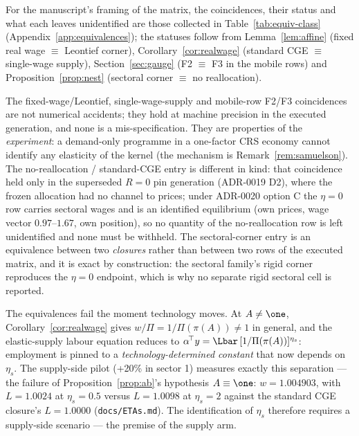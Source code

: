 \begin{corollary}[Classification]\label{cor:class}
For the manuscript's framing of the matrix, the coincidences, their status
and what each leaves unidentified are those collected in
Table~\ref{tab:equiv-class} (Appendix~\ref{app:equivalences}); the
statuses follow from Lemma~\ref{lem:affine} (fixed real wage $\equiv$
Leontief corner), Corollary~\ref{cor:realwage} (standard CGE $\equiv$
single-wage supply), Section~\ref{sec:gauge} (F2 $\equiv$ F3 in the mobile
rows) and Proposition~\ref{prop:nest} (sectoral corner $\equiv$ no
reallocation).

The fixed-wage/Leontief, single-wage-supply and mobile-row F2/F3
coincidences are not numerical
accidents; they hold at machine precision in the executed generation, and
none is a mis-specification. They are properties of the \emph{experiment}: a
demand-only programme in a one-factor CRS economy cannot identify any
elasticity of the kernel (the mechanism is Remark~\ref{rem:samuelson}). The
no-reallocation / standard-CGE entry is different in kind: that
coincidence held only in the
superseded $R = 0$ pin generation (ADR-0019 D2), where the frozen allocation
had no channel to prices; under ADR-0020 option C the $\eta = 0$ row carries
sectoral wages and is an identified equilibrium (own prices, wage vector
$0.97$--$1.67$, own position), so no quantity of the
no-reallocation row is left
unidentified and none must be withheld.
The sectoral-corner entry is an equivalence between two
\emph{closures} rather than between two rows of the executed matrix, and it is
exact by construction: the sectoral family's rigid corner reproduces the
$\eta = 0$ endpoint, which is why no separate rigid sectoral cell is reported.
\end{corollary}

\begin{remark}\label{rem:supply}
The equivalences fail the moment technology moves. At $A \neq \one$,
Corollary~\ref{cor:realwage} gives $w/\Pi = 1/\Pi(\pi(A)) \neq 1$ in
general, and the elastic-supply labour equation reduces to
$\alpha^{\!\top}y = \Lbar\,[1/\Pi(\pi(A))]^{\eta_s}$: employment is pinned
to a \emph{technology-determined constant} that now depends on $\eta_s$.
The supply-side pilot (+20\% in sector 1) measures exactly this separation
--- the failure of Proposition~\ref{prop:ab}'s hypothesis $A \equiv \one$:
$w = 1.004903$, with $L = 1.0024$ at $\eta_s = 0.5$ versus $L = 1.0098$ at
$\eta_s = 2$ against the standard CGE closure's $L = 1.0000$
(\texttt{docs/ETAs.md}). The
identification of $\eta_s$ therefore requires a supply-side scenario ---
the premise of the supply arm.
\end{remark}

